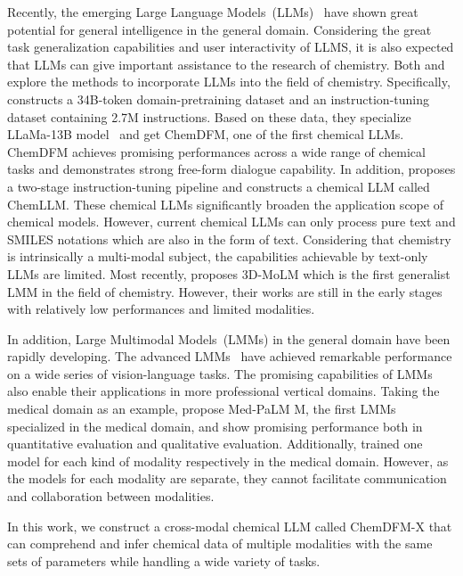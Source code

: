 Recently, the emerging Large Language Models~(LLMs)~\cite{touvron2023llama, openai2023gpt4} have shown great potential for general intelligence in the general domain. Considering the great task generalization capabilities and user interactivity of LLMS, it is also expected that LLMs can give important assistance to the research of chemistry. Both \cite{zhao2024chemdfm} and \cite{zhang2024chemllm} explore the methods to incorporate LLMs into the field of chemistry. Specifically, \cite{zhao2024chemdfm} constructs a 34B-token domain-pretraining dataset and an instruction-tuning dataset containing 2.7M instructions. Based on these data, they specialize LLaMa-13B model~\cite{touvron2023llama} and get ChemDFM, one of the first chemical LLMs. ChemDFM achieves promising performances across a wide range of chemical tasks and demonstrates strong free-form dialogue capability. In addition, \cite{zhang2024chemllm} proposes a two-stage instruction-tuning pipeline and constructs a chemical LLM called ChemLLM. These chemical LLMs significantly broaden the application scope of chemical models. However, current chemical LLMs can only process pure text and SMILES notations which are also in the form of text. Considering that chemistry is intrinsically a multi-modal subject, the capabilities achievable by text-only LLMs are limited. Most recently, \cite{li2024molm} proposes 3D-MoLM which is the first generalist LMM in the field of chemistry. However, their works are still in the early stages with relatively low performances and limited modalities.

In addition, Large Multimodal Models~(LMMs) in the general domain have been rapidly developing. The advanced LMMs~\cite{mplugdocowl, internlmxcomposer,llava,gpt-4v,qwenvl,gemini} have achieved remarkable performance on a wide series of vision-language tasks. The promising capabilities of LMMs also enable their applications in more professional vertical domains. Taking the medical domain as an example, \cite{tu2023generalist} propose Med-PaLM M, the first LMMs specialized in the medical domain, and show promising performance both in quantitative evaluation and qualitative evaluation. Additionally, \cite{yang2024advancing} trained one model for each kind of modality respectively in the medical domain. However, as the models for each modality are separate, they cannot facilitate communication and collaboration between modalities.

In this work, we construct a cross-modal chemical LLM called ChemDFM-X that can comprehend and infer chemical data of multiple modalities with the same sets of parameters while handling a wide variety of tasks.

